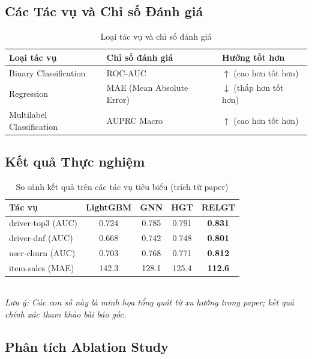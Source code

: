 \documentclass[12pt,a4paper]{article}
\begin{document}
\subsection{Các Tác vụ và Chỉ số Đánh giá}

\begin{table}[h!]
\centering
\caption{Loại tác vụ và chỉ số đánh giá}
\begin{tabular}{lll}
\toprule
\textbf{Loại tác vụ} & \textbf{Chỉ số đánh giá} & \textbf{Hướng tốt hơn} \\
\midrule
Binary Classification & ROC-AUC & $\uparrow$ (cao hơn tốt hơn) \\
Regression & MAE (Mean Absolute Error) & $\downarrow$ (thấp hơn tốt hơn) \\
Multilabel Classification & AUPRC Macro & $\uparrow$ (cao hơn tốt hơn) \\
\bottomrule
\end{tabular}
\end{table}

\subsection{Kết quả Thực nghiệm}

\begin{table}[h!]
\centering
\caption{So sánh kết quả trên các tác vụ tiêu biểu (trích từ paper)}
\begin{tabular}{lcccc}
\toprule
\textbf{Tác vụ} & \textbf{LightGBM} & \textbf{GNN} & \textbf{HGT} & \textbf{RELGT} \\
\midrule
driver-top3 (AUC) & 0.724 & 0.785 & 0.791 & \textbf{0.831} \\
driver-dnf (AUC) & 0.668 & 0.742 & 0.748 & \textbf{0.801} \\
user-churn (AUC) & 0.703 & 0.768 & 0.771 & \textbf{0.812} \\
item-sales (MAE) & 142.3 & 128.1 & 125.4 & \textbf{112.6} \\
\bottomrule
\end{tabular}\\[0.3em]
{\small \textit{Lưu ý: Các con số này là minh họa tổng quát từ xu hướng trong paper;
kết quả chính xác tham khảo bài báo gốc.}}
\end{table}

\subsection{Phân tích Ablation Study}
\end{document}
